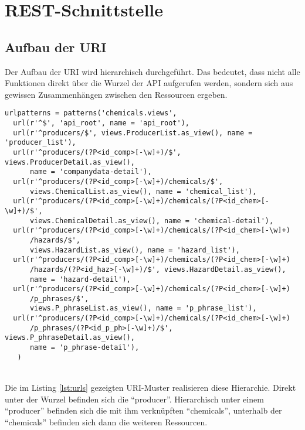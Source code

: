 \section{REST-Schnittstelle}
\label{sec:REST-Schnittstelle_rel}

\subsection{Aufbau der URI}
\label{sec:aufbau_uri}

Der Aufbau der \ac{URI} wird hierarchisch durchgeführt. Das bedeutet, dass nicht
alle Funktionen direkt über die Wurzel der \ac{API} aufgerufen werden, sondern
sich aus gewissen Zusammenhängen zwischen den Ressourcen ergeben.
\begin{lstlisting}[caption={Ein Ausschnitt aus der Datei "`urls.py"' der APP "`chemicals"'. Anhand
    dieser lässt sich der Aufbau der hierarchischen URI
    nachvollziehen}, label=lst:urls, captionpos=b] 
urlpatterns = patterns('chemicals.views',
  url(r'^$', 'api_root', name = 'api_root'),
  url(r'^producers/$', views.ProducerList.as_view(), name = 'producer_list'),
  url(r'^producers/(?P<id_comp>[-\w]+)/$', views.ProducerDetail.as_view(), 
      name = 'companydata-detail'),    
  url(r'^producers/(?P<id_comp>[-\w]+)/chemicals/$', 
      views.ChemicalList.as_view(), name = 'chemical_list'),
  url(r'^producers/(?P<id_comp>[-\w]+)/chemicals/(?P<id_chem>[-\w]+)/$', 
      views.ChemicalDetail.as_view(), name = 'chemical-detail'),   
  url(r'^producers/(?P<id_comp>[-\w]+)/chemicals/(?P<id_chem>[-\w]+)
      /hazards/$',
      views.HazardList.as_view(), name = 'hazard_list'),
  url(r'^producers/(?P<id_comp>[-\w]+)/chemicals/(?P<id_chem>[-\w]+)
      /hazards/(?P<id_haz>[-\w]+)/$', views.HazardDetail.as_view(), 
      name = 'hazard-detail'),
  url(r'^producers/(?P<id_comp>[-\w]+)/chemicals/(?P<id_chem>[-\w]+)
      /p_phrases/$', 
      views.P_phraseList.as_view(), name = 'p_phrase_list'),
  url(r'^producers/(?P<id_comp>[-\w]+)/chemicals/(?P<id_chem>[-\w]+)
      /p_phrases/(?P<id_p_ph>[-\w]+)/$', views.P_phraseDetail.as_view(), 
      name = 'p_phrase-detail'),
   )
\end{lstlisting}
\\
Die im Listing \ref{lst:urls} gezeigten \ac{URI}-Muster realisieren diese
Hierarchie. Direkt unter der Wurzel befinden sich die "`producer"'. Hierarchisch
unter einem "`producer"' befinden sich die mit ihm verknüpften "`chemicals"',
unterhalb der "`chemicals"' befinden sich dann die weiteren Ressourcen.
\\
